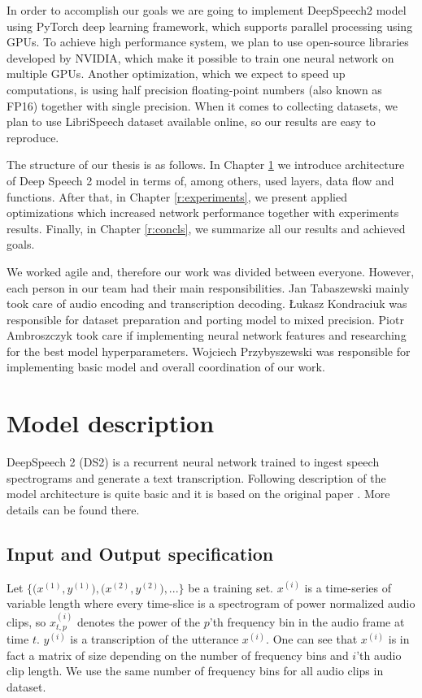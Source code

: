 \documentclass[licencjacka,en]{pracamgr}
\begin{document}
	In order to accomplish our goals we are going to implement DeepSpeech2 model using PyTorch deep learning framework, which supports parallel processing using GPUs. To achieve high performance system, we plan to use open-source libraries developed by NVIDIA, which make it possible to train one neural network on multiple GPUs. Another optimization, which we expect to speed up computations, is using half precision floating-point numbers (also known as FP16) together with single precision. When it comes to collecting datasets, we plan to use LibriSpeech \cite{LIBRI} dataset available online, so our results are easy to reproduce.
	
	The structure of our thesis is as follows. In Chapter \ref{r:desc} we introduce architecture of Deep Speech 2 model in terms of, among others, used layers, data flow and functions. After that, in Chapter \ref{r:experiments}, we present applied optimizations which increased network performance together with experiments results. Finally, in Chapter \ref{r:concls}, we summarize all our results and achieved goals.
	
	We worked agile and, therefore our work was divided between everyone. However, each person in our team had their main responsibilities. Jan Tabaszewski mainly took care of audio encoding and transcription decoding. Łukasz Kondraciuk was responsible for dataset preparation and porting model to mixed precision. Piotr Ambroszczyk took care if implementing neural network features and researching for the best model hyperparameters. Wojciech Przybyszewski was responsible for implementing basic model and overall coordination of our work.
	
	\chapter{Model description}\label{r:desc}
	
	DeepSpeech 2 (DS2) is a recurrent neural network trained to ingest speech spectrograms and generate a text transcription.
	Following description of the model architecture is quite basic and it is based on the original paper \cite{DS2}. More details can be found there.
	
	\section{Input and Output specification} \label{sec:input}
	Let $\big\{\big(x^{(1)}, y^{(1)}\big), \big(x^{(2)}, y^{(2)}\big), ...\big\}$ be a training set. $x^{(i)}$ is a time-series of variable length where every time-slice is a spectrogram of power
	normalized audio clips, so $x^{(i)}_{t,p}$ denotes the power of the $p$’th frequency bin in the audio frame at time $t$. $y^{(i)}$ is a transcription of the utterance $x^{(i)}$. One can see that $x^{(i)}$ is in fact a matrix of size depending on the number of frequency bins and $i$'th audio clip length. We use the same number of frequency bins for all audio clips in dataset.
	
\end{document}

